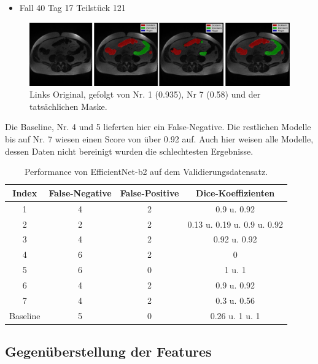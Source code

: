 \begin{itemize}
\item Fall 40 Tag 17 Teilstück 121
\end{itemize}

\begin{figure}[H]
	\begin{center}
		\includegraphics[width=400pt]{LaTex/bilder/case40_day17_slice122_7vs1.png}
		\caption{Links Original, gefolgt von Nr. 1 (0.935), Nr 7 (0.58) und der tatsächlichen Maske. }\label{Fig:7vs1}
	\end{center}
\end{figure}

Die Baseline, Nr. 4 und 5 lieferten hier ein False-Negative. Die restlichen Modelle bis auf Nr. 7 wiesen einen Score von über 0.92 auf. Auch hier weisen alle Modelle, dessen Daten nicht bereinigt wurden die schlechtesten Ergebnisse. 

\begin{table}[H]
\centering
\begin{tabular}{c|c|c|c}
Index & False-Negative & False-Positive & Dice-Koeffizienten  \\\hline
 1    &     4         &    2       &  0.9 u. 0.92   \\
 2    &     2         &    2       & 0.13 u. 0.19 u. 0.9 u. 0.92    \\
 3    &     4         &    2       & 0.92 u. 0.92   \\
 4    &     6         &    2       & 0    \\
 5    &     6         &    0       & 1 u. 1    \\
 6    &     4         &    2       & 0.9 u. 0.92 \\
 7    &     4         &    2       & 0.3 u. 0.56 \\
 Baseline&  5        &    0       & 0.26 u. 1 u. 1\\

\end{tabular}
\caption{\label{tab:efb2-val} Performance von EfficientNet-b2 auf dem Validierungsdatensatz.}
\end{table}

\subsection{Gegenüberstellung der Features}

